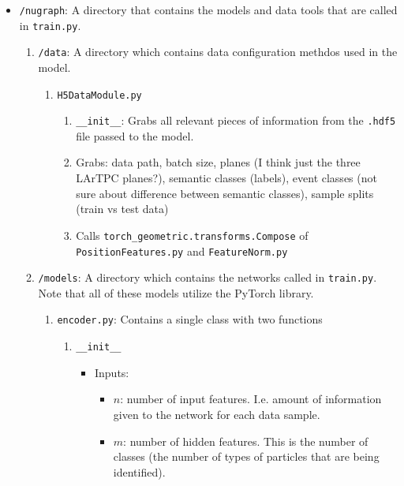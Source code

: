 \begin{itemize}
    \item \texttt{/nugraph}: A directory that contains the models and data tools that are called in \texttt{train.py}.
        \begin{enumerate}
            \item \texttt{/data}: A directory which contains data configuration methdos used in the model.
                \begin{enumerate}
                    \item \texttt{H5DataModule.py}
                        \begin{enumerate}
                            \item \texttt{\_\_init\_\_}: Grabs all relevant pieces of information from the \texttt{.hdf5} file passed to the model.
                            \item Grabs: data path, batch size, planes (I think just the three LArTPC planes?), semantic classes (labels), event classes (not sure about difference between semantic classes), sample splits (train vs test data)
                            \item Calls \texttt{torch\_geometric.transforms.Compose} of \texttt{PositionFeatures.py} and \texttt{FeatureNorm.py}
                        \end{enumerate}
                \end{enumerate}
            \item \texttt{/models}: A directory which contains the networks called in \texttt{train.py}. Note that all of these models utilize the PyTorch library.
                \begin{enumerate}
                    \item \texttt{encoder.py}: Contains a single class with two functions
                        \begin{enumerate}
                            \item \texttt{\_\_init\_\_}
                            \begin{itemize}
                                \item Inputs:
                                    \begin{itemize}
                                        \item $n$: number of input features. I.e. amount of information given to the network for each data sample.

                                        \item $m$: number of hidden features. This is the number of classes (the number of types of particles that are being identified).
                                    \end{itemize}


\end{itemize}
\end{enumerate}
\end{enumerate}
\end{enumerate}
\end{itemize}
